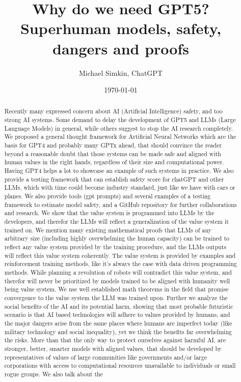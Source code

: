\documentclass{article}
\begin{document}
\title{Why do we need GPT5? \\  Superhuman models, safety, dangers and proofs}
\author{Michael Simkin, ChatGPT}
\date{\today}
\maketitle
\maketitle

\begin{abstract}
Recently many expressed concern about AI (Artificial Intelligence) safety, and too strong AI systems\cite{openletter}. Some demand to delay the development of GPT5 and LLMs (Large Language Models) in general, while others suggest to stop the AI research completely\cite{yudkowsky2023pausing}. We proposed a general thought framework for Artificial Neural Networks which are the basis for GPT4 and probably many GPTx ahead, that should convince the reader beyond a reasonable doubt that those systems can be made safe and aligned with human values in the right hands, regardless of their size and computational power. Having GPT4 helps a lot to showcase an example of such systems in practice. We also provide a testing framework that can establish safety score for chatGPT and other LLMs, which with time could become industry standard, just like we have with cars or planes. We also provide tools (gpt prompts) and several examples of a testing framework to estimate model safety, and a GitHub repository\cite{simkin2023} for further collaborations and research. We show that the value system is programmed into LLMs by the developers, and therefor the LLMs will reflect a generalization of the value system it trained on. We mention many existing mathematical proofs that LLMs of any arbitrary size (including highly overwhelming the human capacity) can be trained to reflect any value system provided by the training procedure, and the LLMs outputs will reflect this value system coherently. The value system is provided by examples and reinforcement training methods, like it's always the case with data driven programming methods. While planning a revolution of robots will contradict this value system, and therefor will never be prioritized by models trained to be aligned with humanity well being value system. We use well established math theorems in the field that promise convergence to the value system the LLM was trained upon. Further we analyze the social benefits of the AI and its potential harm, showing that most probable futuristic scenario is that AI based technologies will adhere to values provided by humans, and the major dangers arise from the same places where humans are imperfect today (like military technology and social inequality), yet we think the benefits far overwhelming the risks. More than that the only way to protect ourselves against harmful AI, are stronger, better, smarter models with aligned values, that should be developed by representatives of values of large communities like governments and/or large corporations with access to computational resources unavailable to individuals or small rogue groups. We also talk about the 
\end{abstract}
\end{document}
